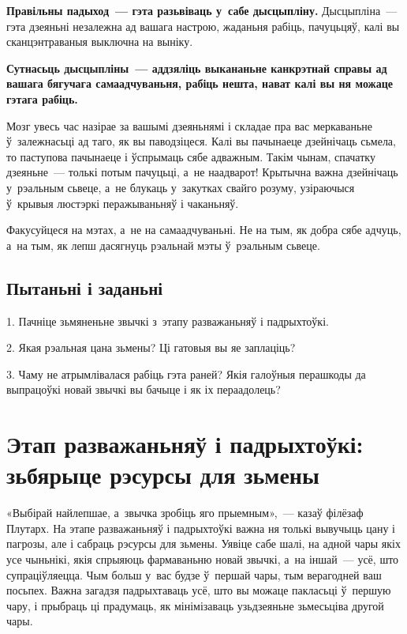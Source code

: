 \textbf{Правільны падыход~--- гэта разьвіваць у~сабе дысцыпліну.} Дысцыпліна~--- гэта дзеяньні незалежна ад вашага настрою, жаданьня рабіць, пачуцьцяў, калі вы сканцэнтраваныя выключна на выніку.

\textbf{Сутнасьць дысцыпліны~--- аддзяліць выкананьне канкрэтнай справы ад вашага бягучага самаадчуваньня, рабіць нешта, нават калі вы ня можаце гэтага рабіць.}

Мозг увесь час назірае за вашымі дзеяньнямі і складае пра вас меркаваньне ў~залежнасьці ад таго, як вы паводзіцеся. Калі вы пачынаеце дзейнічаць сьмела, то паступова пачынаеце і ўспрымаць сябе адважным. Такім чынам, спачатку дзеяньне~--- толькі потым пачуцьці, а~не наадварот! Крытычна важна дзейнічаць у~рэальным сьвеце, а~не блукаць у~закутках свайго розуму, узіраючыся ў~крывыя люстэркі перажываньняў і чаканьняў. 

Факусуйцеся на мэтах, а~не на самаадчуваньні. Не на тым, як добра сябе адчуць, а~на тым, як лепш дасягнуць рэальнай мэты ў~рэальным сьвеце.

\subsection*{Пытаньні і заданьні}

1. Пачніце зьмяненьне звычкі з~этапу разважаньняў і падрыхтоўкі.

2. Якая рэальная цана зьмены? Ці гатовыя вы яе заплаціць?

3. Чаму не атрымлівалася рабіць гэта раней? Якія галоўныя перашкоды да выпрацоўкі новай звычкі вы бачыце і як іх пераадолець?


\section{Этап разважаньняў і падрыхтоўкі: зьбярыце рэсурсы для зьмены}

«Выбірай найлепшае, а~звычка зробіць яго прыемным»,~--- казаў філёзаф Плутарх. На этапе разважаньняў і падрыхтоўкі важна ня толькі вывучыць цану і пагрозы, але і сабраць рэсурсы для зьмены. Уявіце сабе шалі, на адной чары якіх усе чыньнікі, якія спрыяюць фармаваньню новай звычкі, а~на іншай~--- усё, што супраціўляецца. Чым больш у~вас будзе ў~першай чары, тым верагодней ваш посьпех. Важна загадзя падрыхтаваць усё, што вы можаце пакласьці ў~першую чару, і прыбраць ці прадумаць, як мінімізаваць узьдзеяньне зьмесьціва другой чары.


